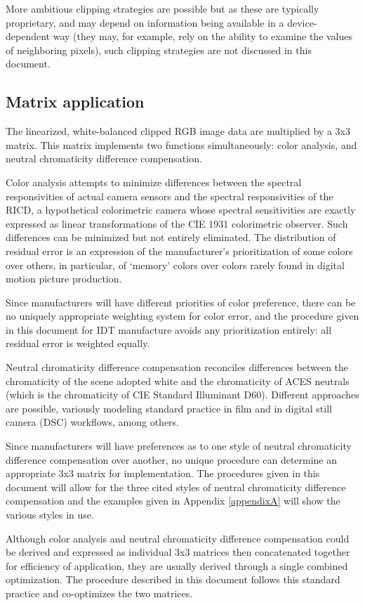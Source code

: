More ambitious clipping strategies are possible but as these are typically proprietary, and may depend on information being available in a device-dependent way (they may, for example, rely on the ability to examine the values of neighboring pixels), such clipping strategies are not discussed in this document.

\subsection{Matrix application}
The linearized, white-balanced clipped RGB image data are multiplied by a 3x3 matrix. This matrix implements two functions simultaneously: color analysis, and neutral chromaticity difference compensation.

Color analysis attempts to minimize differences between the spectral responsivities of actual camera sensors and the spectral responsivities of the RICD, a hypothetical colorimetric camera whose spectral sensitivities are exactly expressed as linear transformations of the CIE 1931 colorimetric observer. Such differences can be minimized but not entirely eliminated. The distribution of residual error is an expression of the manufacturer's prioritization of some colors over others, in particular, of `memory' colors over colors rarely found in digital motion picture production.

Since manufacturers will have different priorities of color preference, there can be no uniquely appropriate weighting system for color error, and the procedure given in this document for IDT manufacture avoids any prioritization entirely: all residual error is weighted equally.

Neutral chromaticity difference compensation reconciles differences between the chromaticity of the scene adopted white and the chromaticity of ACES neutrals (which is the chromaticity of CIE Standard Illuminant D60). Different approaches are possible, variously modeling standard practice in film and in digital still camera (DSC) workflows, among others.

Since manufacturers will have preferences as to one style of neutral chromaticity difference compensation over another, no unique procedure can determine an appropriate 3x3 matrix for implementation. The procedures given in this document will allow for the three cited styles of neutral chromaticity difference compensation and the examples given in Appendix \ref{appendixA} will show the various styles in use.

Although color analysis and neutral chromaticity difference compensation could be derived and expressed as individual 3x3 matrices then concatenated together for efficiency of application, they are usually derived through a single combined optimization. The procedure described in this document follows this standard practice and co-optimizes the two matrices.

